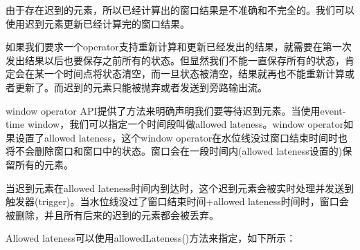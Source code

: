 \documentclass[cn,11pt,chinese]{elegantbook}
\begin{document}
由于存在迟到的元素，所以已经计算出的窗口结果是不准确和不完全的。我们可以使用迟到元素更新已经计算完的窗口结果。

如果我们要求一个operator支持重新计算和更新已经发出的结果，就需要在第一次发出结果以后也要保存之前所有的状态。但显然我们不能一直保存所有的状态，肯定会在某一个时间点将状态清空，而一旦状态被清空，结果就再也不能重新计算或者更新了。而迟到的元素只能被抛弃或者发送到旁路输出流。

window operator API提供了方法来明确声明我们要等待迟到元素。当使用event-time window，我们可以指定一个时间段叫做allowed lateness。window operator如果设置了allowed lateness，这个window operator在水位线没过窗口结束时间时也将不会删除窗口和窗口中的状态。窗口会在一段时间内(allowed lateness设置的)保留所有的元素。

当迟到元素在allowed lateness时间内到达时，这个迟到元素会被实时处理并发送到触发器(trigger)。当水位线没过了窗口结束时间+allowed lateness时间时，窗口会被删除，并且所有后来的迟到的元素都会被丢弃。

Allowed lateness可以使用allowedLateness()方法来指定，如下所示：
\end{document}
